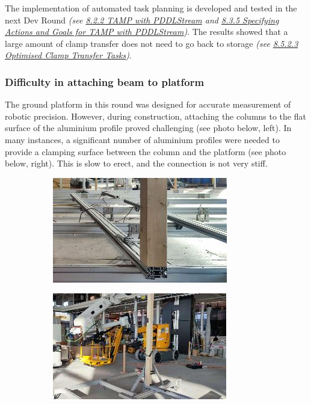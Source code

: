 \documentclass[11pt]{book}
\begin{document}
The implementation of automated task planning is developed and tested in the next Dev Round \textit{\textcolor[HTML]{B7B7B7}{(see \uline{8.2.2 TAMP with PDDLStream} and \uline{8.3.5 Specifying Actions and Goals for TAMP with PDDLStream})}}. The results showed that a large amount of clamp transfer does not need to go back to storage \textit{\textcolor[HTML]{B7B7B7}{(see \uline{8.5.2.3 Optimised Clamp Transfer Tasks})}}.

\subsubsection{Difficulty in attaching beam to platform}

The ground platform in this round was designed for accurate measurement of robotic precision. However, during construction, attaching the columns to the flat surface of the aluminium profile proved challenging (see photo below, left). In many instances, a significant number of aluminium profiles were needed to provide a clamping surface between the column and the platform (see photo below, right). This is slow to erect, and the connection is not very stiff.

\begin{figure}[H]
\centering
\begin{subfigure}[b]{0.45\textwidth}
\centering
\includegraphics[width=\textwidth]{./images/image82.jpeg}
\end{subfigure}
\hfill
\begin{subfigure}[b]{0.45\textwidth}
\centering
\includegraphics[width=\textwidth]{./images/image83.jpeg}
\end{subfigure}
\end{figure}
\end{document}
